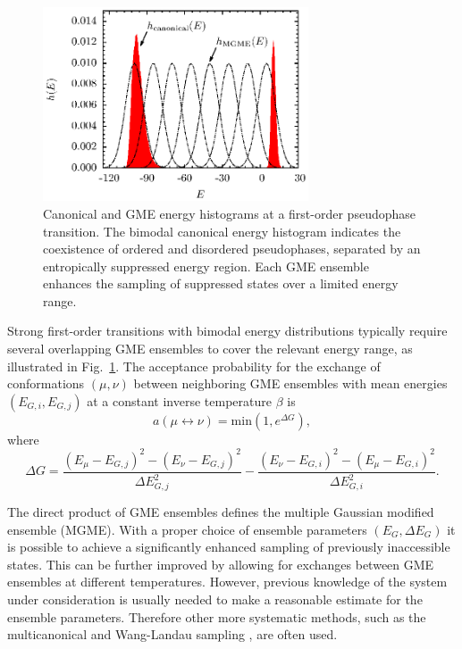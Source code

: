 \documentclass[12pt]{report}
\begin{document}
\begin{figure}
\center
\includegraphics[width = 0.7\textwidth]{chapter3Figs/mgme.eps}
\caption{\label{fig:MGME}%
Canonical and GME energy histograms at a first-order pseudophase transition. The bimodal canonical energy histogram indicates the coexistence of ordered and disordered pseudophases, separated by an entropically suppressed energy region. Each GME ensemble enhances the sampling of suppressed states over a limited energy range.}
\end{figure} 
% 


Strong first-order transitions with bimodal energy distributions typically
require several overlapping GME ensembles to cover the relevant energy range, as illustrated in Fig.~\ref{fig:MGME}. The acceptance probability for the
exchange of conformations $(\mu,\nu)$ between neighboring GME ensembles with mean energies $(E_{G,i}, E_{G,j})$ at a constant inverse temperature $\beta$ is
%
\begin{equation}
a\left(\mu \leftrightarrow \nu \right) = 	
\mathrm{min}\left(1,e^{\Delta G}\right),
\end{equation}
%
where
\begin{equation}
\Delta G  = 
\frac{\left(E_{\mu} - E_{G,j}\right)^{2}-\left(E_{\nu}-
E_{G,j}\right)^{2}}{\Delta E_{G,j}^{2}} - \frac{\left(E_{\nu} - 	
E_{G,i}\right)^{2}-\left(E_{\mu} - E_{G,i}\right)^{2}}{\Delta E_{G,i}^{2}}.
\end{equation}

The direct product of GME ensembles defines the multiple Gaussian modified ensemble (MGME). With a proper choice of ensemble parameters $(E_{G},\Delta E_{G})$ it is possible to achieve a significantly enhanced sampling of previously inaccessible states. This can be further improved by allowing for exchanges between GME ensembles at different temperatures. However, previous knowledge of the system under consideration is usually needed to make a reasonable estimate for the ensemble parameters. Therefore other more systematic methods, such as the multicanonical \cite{muca1a,muca1b,muca2,muca3,muca4,Bachmann2013} and Wang-Landau sampling \cite{wl1,wl2,wl3}, are often used.    
\end{document}
